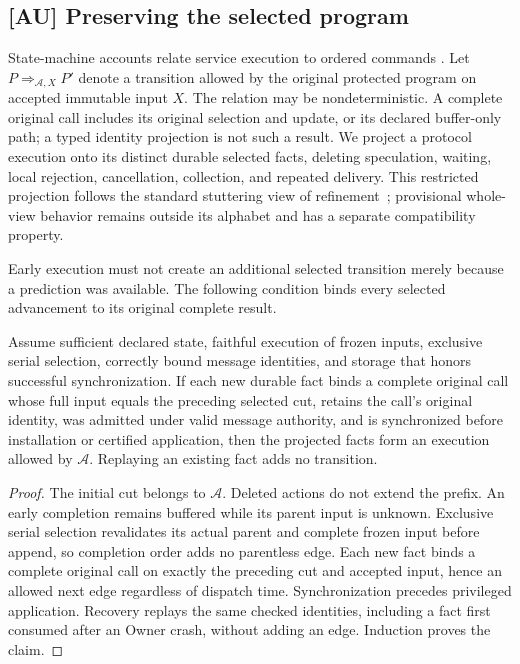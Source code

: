 \subsection{[AU] Preserving the selected program}
\label{subsec:native_refinement}
State-machine accounts relate service execution to ordered commands
\cite{schneider1990statemachine}. Let $P \mathrel{\Rightarrow_{\mathcal A,X}} P'$ denote a transition allowed
by the original protected program on accepted immutable input $X$.
The relation may be nondeterministic. A complete original call includes
its original selection and update, or its declared buffer-only path;
a typed identity projection is not such a result. We project a protocol
execution onto its distinct durable selected facts, deleting speculation,
waiting, local rejection, cancellation, collection, and repeated delivery.
This restricted projection follows the standard stuttering view of
refinement~\cite{abadi1991refinement}; provisional whole-view behavior
remains outside its alphabet and has a separate compatibility property.

Early execution must not create an additional selected transition merely
because a prediction was available. The following condition binds every
selected advancement to its original complete result.
\begin{proposition}
\label{prop:refinement}
Assume sufficient declared state, faithful execution of frozen inputs,
exclusive serial selection, correctly bound message identities, and
storage that honors successful synchronization. If each new durable fact
binds a complete original call whose full input equals the preceding
selected cut, retains the call's original identity, was admitted under
valid message authority, and is synchronized before installation or certified
application, then the projected facts form an execution allowed by
$\mathcal A$. Replaying an existing fact adds no transition.
\end{proposition}
\begin{proof}
The initial cut belongs to $\mathcal A$. Deleted actions do not extend
the prefix. An early completion remains buffered while its parent input
is unknown. Exclusive serial selection revalidates its actual parent and
complete frozen input before append, so completion order adds no parentless
edge. Each new fact binds a complete original call on exactly the
preceding cut and accepted input, hence an allowed next edge regardless
of dispatch time. Synchronization precedes privileged application.
Recovery replays the same checked identities, including a fact first
consumed after an Owner crash, without adding an edge. Induction proves
the claim.
\end{proof}

